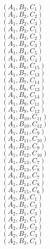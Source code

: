 \documentclass[14pt]{article}
\begin{document}
    $({A}_{1}, {B}_{2}, {C}_{1}) $ \\ 
    $({A}_{1}, {B}_{2}, {C}_{2}) $ \\ 
    $({A}_{1}, {B}_{2}, {C}_{3}) $ \\ 
    $({A}_{1}, {B}_{3}, {C}_{1}) $ \\ 
    $({A}_{1}, {B}_{3}, {C}_{2}) $ \\ 
    $({A}_{1}, {B}_{3}, {C}_{3}) $ \\ 
    $({A}_{1}, {B}_{4}, {C}_{5}) $ \\ 
    $({A}_{1}, {B}_{5}, {C}_{4}) $ \\ 
    $({A}_{1}, {B}_{6}, {C}_{15}) $ \\ 
    $({A}_{1}, {B}_{7}, {C}_{13}) $ \\ 
    $({A}_{1}, {B}_{7}, {C}_{14}) $ \\ 
    $({A}_{1}, {B}_{8}, {C}_{13}) $ \\ 
    $({A}_{1}, {B}_{8}, {C}_{14}) $ \\ 
    $({A}_{1}, {B}_{9}, {C}_{11}) $ \\ 
    $({A}_{1}, {B}_{9}, {C}_{12}) $ \\ 
    $({A}_{1}, {B}_{10}, {C}_{11}) $ \\ 
    $({A}_{1}, {B}_{10}, {C}_{12}) $ \\ 
    $({A}_{1}, {B}_{11}, {C}_{9}) $ \\ 
    $({A}_{1}, {B}_{11}, {C}_{10}) $ \\ 
    $({A}_{1}, {B}_{12}, {C}_{9}) $ \\ 
    $({A}_{1}, {B}_{12}, {C}_{10}) $ \\ 
    $({A}_{1}, {B}_{13}, {C}_{7}) $ \\ 
    $({A}_{1}, {B}_{13}, {C}_{8}) $ \\ 
    $({A}_{1}, {B}_{14}, {C}_{7}) $ \\ 
    $({A}_{1}, {B}_{14}, {C}_{8}) $ \\ 
    $({A}_{1}, {B}_{15}, {C}_{6}) $ \\ 
    $({A}_{2}, {B}_{1}, {C}_{1}) $ \\ 
    $({A}_{2}, {B}_{1}, {C}_{2}) $ \\ 
    $({A}_{2}, {B}_{1}, {C}_{3}) $ \\ 
    $({A}_{2}, {B}_{2}, {C}_{1}) $ \\ 
    $({A}_{2}, {B}_{2}, {C}_{2}) $ \\ 
    $({A}_{2}, {B}_{2}, {C}_{3}) $ \\ 
    $({A}_{2}, {B}_{3}, {C}_{1}) $ \\ 
\end{document}
